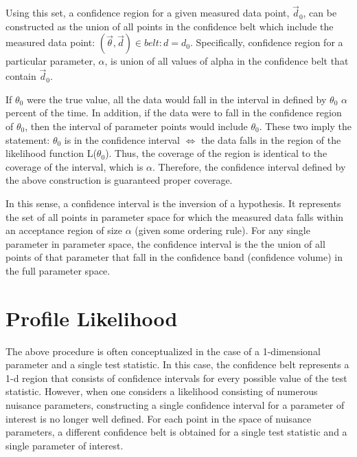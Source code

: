 Using this set, a confidence region for a given measured data point, $\vec{d}_0$, can be constructed as the union of all points in the confidence belt which include the measured data point: ${ ( \vec{ \theta }, \vec{d}) \in belt : d = d_{0}}$.
Specifically, confidence region for a particular parameter, $\alpha$, is union of all values of alpha in the confidence belt that contain $\vec{d}_0$.

If $\theta_0$ were the true value, all the data would fall in the interval in defined by $\theta_0$ $\alpha$ percent of the time.
In addition, if the data were to fall in the confidence region of $\theta_0$, then the interval of parameter points would include $\theta_0$.
These two imply the statement: $\theta_0$ is in the confidence interval $\iff$ the data falls in the region of the likelihood function L($\theta_0$).
Thus, the coverage of the region is identical to the coverage of the interval, which is $\alpha$.
Therefore, the confidence interval defined by the above construction is guaranteed proper coverage.

In this sense, a confidence interval is the inversion of a hypothesis.
It represents the set of all points in parameter space for which the measured data falls within an acceptance region of size $\alpha$ (given some ordering rule).
For any single parameter in parameter space, the confidence interval is the the union of all points of that parameter that fall in the confidence band (confidence volume) in the full parameter space.


\section{Profile Likelihood}

The above procedure is often conceptualized in the case of a 1-dimensional parameter and a single test statistic.
In this case, the confidence belt represents a 1-d region that consists of confidence intervals for every possible value of the test statistic.
However, when one considers a likelihood consisting of numerous nuisance parameters, constructing a single confidence interval for a parameter of interest is no longer well defined.
For each point in the space of nuisance parameters, a different confidence belt is obtained for a single test statistic and a single parameter of interest.

